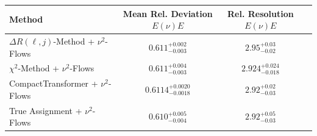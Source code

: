     \begin{tabular}{lccc}
        \toprule
        Method & Mean Rel. Deviation $E(\nu)E$ & Rel. Resolution $E(\nu)E$ \\
        \midrule
        $\Delta R(\ell,j)$-Method + $\nu^2$-Flows & $0.611^{+0.002}_{-0.003}$ & $2.95^{+0.03}_{-0.02}$ \\
        $\chi^2$-Method + $\nu^2$-Flows & $0.611^{+0.004}_{-0.003}$ & $2.924^{+0.024}_{-0.018}$ \\
        CompactTransformer + $\nu^2$-Flows & $0.6114^{+0.0020}_{-0.0018}$ & $2.92^{+0.02}_{-0.03}$ \\
        True Assignment + $\nu^2$-Flows & $0.610^{+0.005}_{-0.004}$ & $2.92^{+0.05}_{-0.03}$ \\
        \bottomrule
    \end{tabular}